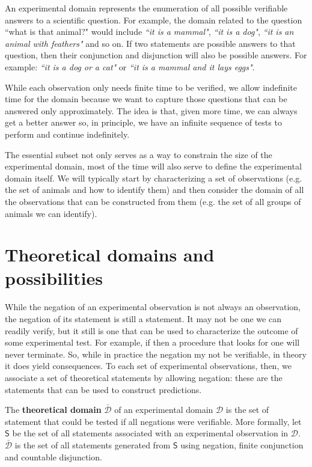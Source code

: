 \documentclass[11pt,letterpaper,fleqn]{memoir} %
\begin{document}
An experimental domain represents the enumeration of all possible verifiable answers to a scientific question. For example, the domain related to the question ``what is that animal?" would include \emph{``it is a mammal"}, \emph{``it is a dog"}, \emph{``it is an animal with feathers"} and so on. If two statements are possible answers to that question, then their conjunction and disjunction will also be possible answers. For example: \emph{``it is a dog or a cat"} or \emph{``it is a mammal and it lays eggs"}.

While each observation only needs finite time to be verified, we allow indefinite time for the domain because we want to capture those questions that can be answered only approximately. The idea is that, given more time, we can always get a better answer so, in principle, we have an infinite sequence of tests to perform and continue indefinitely.

The essential subset not only serves as a way to constrain the size of the experimental domain, most of the time will also serve to define the experimental domain itself. We will typically start by characterizing a set of observations (e.g. the set of animals and how to identify them) and then consider the domain of all the observations that can be constructed from them (e.g. the set of all groups of animals we can identify).

\section{Theoretical domains and possibilities}


While the negation of an experimental observation is not always an observation, the negation of its statement is still a statement. It may not be one we can readily verify, but it still is one that can be used to characterize the outcome of some experimental test. For example, if  then a procedure that looks for one will never terminate. So, while in practice the negation my not be verifiable, in theory it does yield consequences. To each set of experimental observations, then, we associate a set of theoretical statements by allowing negation: these are the statements that can be used to construct predictions.

\begin{mathSection}
\begin{defn}
	The \textbf{theoretical domain} $\bar{\mathcal{D}}$ of an experimental domain $\mathcal{D}$ is the set of statement that could be tested if all negations were verifiable. More formally, let $\mathsf{S}$ be the set of all statements associated with an experimental observation in $\mathcal{D}$. $\bar{\mathcal{D}}$ is the set of all statements generated from $\mathsf{S}$ using negation, finite conjunction and countable disjunction.
\end{defn}
\end{mathSection}
\end{document}
